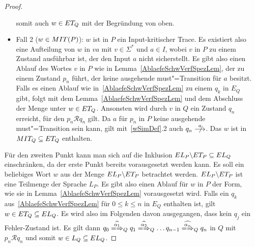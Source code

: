 \begin{proof}
\begin{itemize}
      somit auch $w\in ET _Q$ mit der Begründung von oben.
    \item Fall 2 ($w\in MIT (P)$): $w$ ist in $P$ ein Input-kritischer Trace.
      Es existiert also eine Aufteilung von $w$ in $va$ mit $v\in \Sigma ^*$
      und $a\in I$, wobei $v$ in $P$ zu einem Zustand ausführbar ist, der den
      Input $a$ nicht sicherstellt. Es gibt also einen Ablauf des Wortes $v$ in
      $P$ wie in Lemma~\ref{AblaefeSchwVerfSpezLem}, der zu einem Zustand $p_n$
      führt, der keine ausgehende must"=Transition für $a$ besitzt. Falls es
      einen Ablauf wie in~\ref{AblaefeSchwVerfSpezLem} zu einem $q_k$ in $E_Q$
      gibt, folgt mit dem Lemma~\ref{AblaefeSchwVerfSpezLem} und dem Abschluss
      der Menge \ET{} unter \cont{} $w\in ET _Q$. Ansonsten wird durch $v$ in
      $Q$ ein Zustand $q_n$ erreicht, für den $p_n\mathcal{R} q_n$ gilt. Da $a$
      für $p_n$ in $P$ keine ausgehende must"=Transition sein kann, gilt
      mit~\ref{wSimDef}.2 auch $q_n \nmust[a]$. Das $w$ ist in $MIT _Q
      \subseteq ET _Q$ enthalten.
  \end{itemize}
  Für den zweiten Punkt kann man sich auf die Inklusion $EL _P\backslash ET _P
  \subseteq EL _Q$ einschränken, da der erste Punkt bereits vorausgesetzt
  werden kann. Es soll ein beliebiges Wort $w$ aus der Menge $EL
  _P\backslash ET _P$ betrachtet werden. $EL _P\backslash ET _P$ ist eine
  Teilmenge der Sprache $L _P$. Es gibt also einen Ablauf für $w$ in $P$ der
  Form, wie sie in Lemma~\ref{AblaefeSchwVerfSpezLem} vorausgesetzt wird. Falls
  ein $q_k$ aus~\ref{AblaefeSchwVerfSpezLem} für $0 \leq k \leq n$ in $E_Q$
  enthalten ist, gilt $w\in ET _Q \subseteq EL _Q$. Es wird also im Folgenden
  davon ausgegangen, dass kein $q_j$ ein Fehler-Zustand ist. Es gilt dann $q_0
  \weakmay[\widehat{\alpha _1}]_Q q_1 \weakmay[\widehat{\alpha _2}]_Q \dots
  q_{n-1} \weakmay[\widehat{\alpha _n}]_Q q_n$ in $Q$ mit $p_n \mathcal{R} q_n$
  und somit $w\in L _Q\subseteq EL _Q$.


\end{proof}
